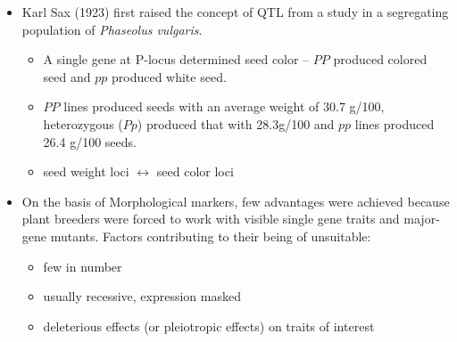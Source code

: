 \documentclass[
  ignorenonframetext,
  aspectratio=169]{beamer}
\providecommand{\tightlist}{%
  \setlength{\itemsep}{0pt}\setlength{\parskip}{0pt}}
\begin{document}
\begin{frame}{}
\protect\hypertarget{section-1}{}
\begin{itemize}
\tightlist
\item
  Karl Sax (1923) first raised the concept of QTL from a study in a
  \alert{segregating population} of \emph{Phaseolus vulgaris}.

  \begin{itemize}
  \tightlist
  \item
    A single gene at P-locus determined seed color -- \(PP\) produced
    colored seed and \(pp\) produced white seed.
  \item
    \(PP\) lines produced seeds with an average weight of 30.7 g/100,
    heterozygous (\(Pp\)) produced that with 28.3g/100 and \(pp\) lines
    produced 26.4 g/100 seeds.
  \item
    seed weight loci \(\longleftrightarrow\) seed color loci
  \end{itemize}
\item
  On the basis of \alert{Morphological markers}, few advantages were
  achieved because plant breeders were forced to work with visible
  single gene traits and major-gene mutants. Factors contributing to
  their being of unsuitable:

  \begin{itemize}
  \tightlist
  \item
    few in number
  \item
    usually recessive, expression masked
  \item
    deleterious effects (or pleiotropic effects) on traits of interest
  \end{itemize}
\end{itemize}
\end{frame}
\end{document}
